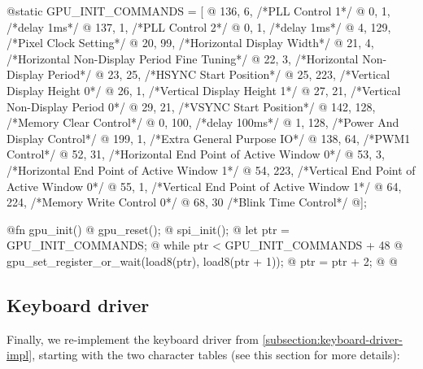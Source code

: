 {@static GPU_INIT_COMMANDS = [
@  136,   6, /*PLL Control 1*/
@  0,     1, /*delay 1ms*/
@  137,   1, /*PLL Control 2*/
@  0,     1, /*delay 1ms*/
@  4,   129, /*Pixel Clock Setting*/
@  20,   99, /*Horizontal Display Width*/
@  21,    4, /*Horizontal Non-Display Period Fine Tuning*/
@  22,    3, /*Horizontal Non-Display Period*/
@  23,   25, /*HSYNC Start Position*/
@  25,  223, /*Vertical Display Height 0*/
@  26,    1, /*Vertical Display Height 1*/
@  27,   21, /*Vertical Non-Display Period 0*/
@  29,   21, /*VSYNC Start Position*/
@  142, 128, /*Memory Clear Control*/
@  0,   100, /*delay 100ms*/
@  1,   128, /*Power And Display Control*/
@  199,   1, /*Extra General Purpose IO*/
@  138,  64, /*PWM1 Control*/
@  52,   31, /*Horizontal End Point of Active Window 0*/
@  53,    3, /*Horizontal End Point of Active Window 1*/
@  54,  223, /*Vertical End Point of Active Window 0*/
@  55,    1, /*Vertical End Point of Active Window 1*/
@  64,  224, /*Memory Write Control 0*/
@  68,   30  /*Blink Time Control*/
@];

@fn gpu_init() {
@  gpu_reset();
@  spi_init();
@  let ptr = GPU_INIT_COMMANDS;
@  while ptr < GPU_INIT_COMMANDS + 48 {
@    gpu_set_register_or_wait(load8(ptr), load8(ptr + 1));
@    ptr = ptr + 2;
@  }
@}
}%

\subsection{Keyboard driver}

Finally, we re-implement the keyboard driver from
\cref{subsection:keyboard-driver-impl}, starting with the two character tables
(see this section for more details):

